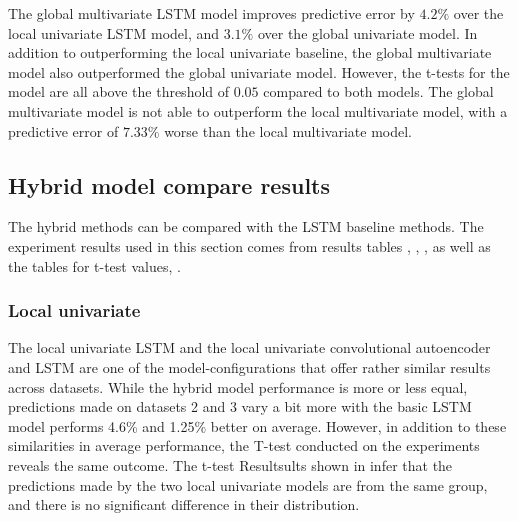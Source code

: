 The global multivariate LSTM model improves predictive error by $4.2\%$ over the local univariate LSTM model,
and $3.1\%$ over the global univariate model.
In addition to outperforming the local univariate baseline, the global multivariate model also outperformed the global univariate model.
However, the t-tests for the model are all above the threshold of $0.05$ compared to both models.
The global multivariate model is not able to outperform the local multivariate model,
with a predictive error of $7.33\%$ worse than the local multivariate model.






\subsection{Hybrid model compare results}
\label{section:discussion&results:experiment-results:CNN-AE-LSTM}
The hybrid methods can be compared with the LSTM baseline methods.
The experiment results used in this section comes from results tables
, , ,
as well as the tables for t-test values, .


\subsubsection{Local univariate}
\label{section:discussion&results:experiment-results:CNN-AE-LSTM:Local-Univariate}
The local univariate LSTM and the local univariate convolutional autoencoder and LSTM are one of the model-configurations
that offer rather similar results across datasets.
While the hybrid model performance is more or less equal, predictions made on datasets 2 and 3 vary a bit more
with the basic LSTM model performs 4.6\% and 1.25\% better on average.
However, in addition to these similarities in average performance, the T-test conducted on the experiments reveals the same outcome.
The t-test Resultsults shown in  infer that the predictions made by the two local univariate models
are from the same group, and there is no significant difference in their distribution.



